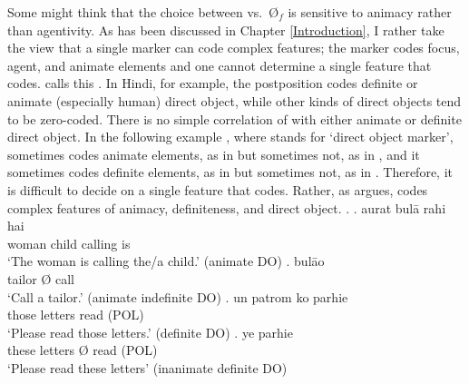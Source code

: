 Some might think that the choice between  vs.\ {\O$_{f}$} is sensitive to animacy rather than agentivity.
As has been discussed in Chapter \ref{Introduction}, I rather take the view that a single marker can code complex features;
the marker  codes focus, agent, and animate elements
and one cannot determine a single feature that  codes.
 calls this .
In Hindi,
for example,
the postposition  codes definite or animate (especially human) direct object,
while other kinds of direct objects tend to be zero-coded.
There is no simple correlation of  with either animate or definite direct object.
In the following example \Next,
where  stands for `direct object marker',
sometimes  codes animate elements, as in \Next[a] but sometimes not, as in \Next[c],
and it sometimes codes definite elements, as in \Next[c] but sometimes not, as in \Next[a,d].
Therefore,
it is difficult to decide on a single feature that  codes.
Rather,
as  argues,
 codes complex features of animacy, definiteness, and direct object.
\ex.
 \ag. aurat   bul\={a} rahi hai \\
	woman child  calling  is \\
	`The woman is calling the/a child.' \hfill{(animate DO)}
 \bg.  \EM{\O} bul\={a}o \\
	tailor {\O} call \\
	`Call a tailor.' \hfill{(animate indefinite DO)}
 \bg. un patrom ko parhie \\
	those letters  read (POL) \\
	`Please read those letters.' \hfill{(definite DO)}
 \bg. ye  \EM{\O} parhie \\
	these letters {\O} read (POL) \\
	`Please read these letters' \hfill{(inanimate definite DO)}
\begin{flushright}
\cite[][p.\ 48]{mcgregor72}
\end{flushright}

